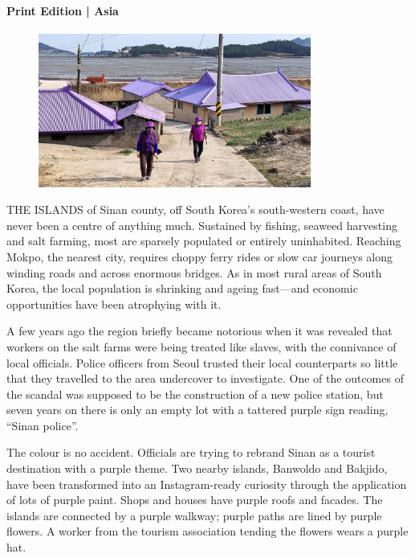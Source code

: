 \documentclass{article}
\begin{document}
\paragraph{Print Edition | Asia  \quad \color{gray}{Mar 25th 2021 }}
\begin{figure}[h]
\centering
\includegraphics[width=0.8\textwidth]{images/20210327_ASP001_0.jpg}
\end{figure}
\lettrine{T}HE ISLANDS of Sinan county, off South Korea's south-western coast, have never been a centre of anything much. Sustained by fishing, seaweed harvesting and salt farming, most are sparsely populated or entirely uninhabited. Reaching Mokpo, the nearest city, requires choppy ferry rides or slow car journeys along winding roads and across enormous bridges. As in most rural areas of South Korea, the local population is shrinking and ageing fast---and economic opportunities have been atrophying with it. 

A few years ago the region briefly became notorious when it was revealed that workers on the salt farms were being treated like slaves, with the connivance of local officials. Police officers from Seoul trusted their local counterparts so little that they travelled to the area undercover to investigate. One of the outcomes of the scandal was supposed to be the construction of a new police station, but seven years on there is only an empty lot with a tattered purple sign reading, ``Sinan police''. 

The colour is no accident. Officials are trying to rebrand Sinan as a tourist destination with a purple theme. Two nearby islands, Banwoldo and Bakjido, have been transformed into an Instagram-ready curiosity through the application of lots of purple paint. Shops and houses have purple roofs and facades. The islands are connected by a purple walkway; purple paths are lined by purple flowers. A worker from the tourism association tending the flowers wears a purple hat. 
\end{document}
